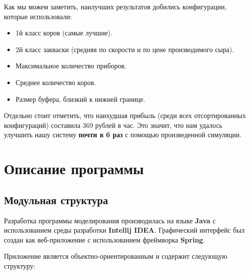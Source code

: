 \documentclass[a4paper, 14pt]{article}
\begin{document}
Как мы можем заметить, наилучших результатов добились конфигурации, которые использовали:

\begin{itemize}
	\item 1й класс коров (самые лучшие).
	\item 2й класс закваски (средняя по скорости и по цене производимого сыра).
	\item Максимальное количество приборов.
	\item Среднее количество коров.
	\item Размер буфера, близкий к нижней границе.
\end{itemize}

Отдельно стоит отметить, что наихудшая прибыль (среди всех отсортированных конфигураций) составила 369 рублей в час. Это значит, что нам удалось улучшить нашу систему \textbf{почти в 6 раз} с помощью произведенной симуляции.

\section{Описание программы}

\subsection{Модульная структура}

Разработка программы моделирования производилась на языке \textbf{Java} с использованием среды разработки \textbf{Intellij IDEA}. Графический интерфейс был создан как веб-приложение с использованием фреймворка \textbf{Spring}.

Приложение является объектно-ориентированным и содержит следующую структуру:
\end{document}
